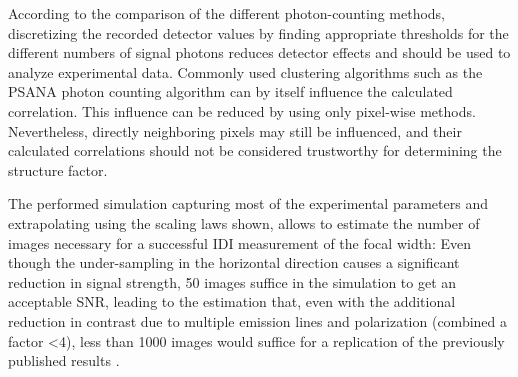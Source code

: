 According to the comparison of the different photon-counting methods, discretizing the recorded detector values by finding appropriate thresholds for the different numbers of signal photons reduces detector effects and should be used to analyze experimental data. Commonly used clustering algorithms such as the PSANA photon counting algorithm can by itself influence the calculated correlation. This influence can be reduced by using only pixel-wise methods. Nevertheless, directly neighboring pixels may still be influenced, and their calculated correlations should not be considered trustworthy for determining the structure factor.


The performed simulation capturing most of the experimental parameters and extrapolating using the scaling laws shown, allows to estimate the number of images necessary for a successful IDI measurement of the focal width: Even though the under-sampling in the horizontal direction causes a significant reduction in signal strength, 50 images suffice in the simulation to get an acceptable SNR, leading to the estimation that, even with the additional reduction in contrast due to multiple emission lines and polarization (combined a factor <4), less than 1000 images would suffice for a replication of the previously published results \cite{nakumura2020}.




